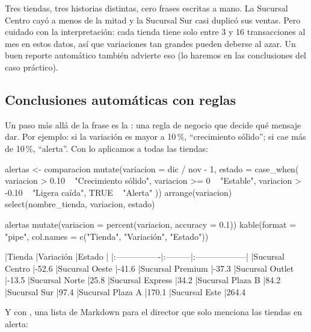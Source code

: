 Tres tiendas, tres historias distintas, cero frases escritas a mano. La
Sucursal Centro cayó a menos de la mitad y la Sucursal Sur casi duplicó sus
ventas. Pero cuidado con la interpretación: cada tienda tiene solo entre 3 y
16 transacciones al mes en estos datos, así que variaciones tan grandes
pueden deberse al azar. Un buen reporte automático también advierte eso
(lo haremos en las conclusiones del caso práctico).

\subsection{Conclusiones automáticas con reglas}

Un paso más allá de la frase es la : una
regla de negocio que decide qué mensaje dar. Por ejemplo: si la variación es
mayor a 10\,\%, ``crecimiento sólido''; si cae más de 10\,\%, ``alerta''. Con
 lo aplicamos a todas las tiendas:

\begin{rcode}
alertas <- comparacion %
  mutate(variacion = dic / nov - 1,
         estado = case_when(
           variacion >  0.10 ~ "Crecimiento sólido",
           variacion >= 0    ~ "Estable",
           variacion > -0.10 ~ "Ligera caída",
           TRUE              ~ "Alerta"
         )) %
  arrange(variacion) %
  select(nombre_tienda, variacion, estado)

alertas %
  mutate(variacion = percent(variacion, accuracy = 0.1)) %
  kable(format = "pipe", col.names = c("Tienda", "Variación", "Estado"))
\end{rcode}
\begin{rsalida}


|Tienda           |Variación |Estado             |
|:----------------|:---------|:------------------|
|Sucursal Centro  |-52.6%
|Sucursal Oeste   |-41.6%
|Sucursal Premium |-37.3%
|Sucursal Outlet  |-13.5%
|Sucursal Norte   |25.8%
|Sucursal Express |34.2%
|Sucursal Plaza B |84.2%
|Sucursal Sur     |97.4%
|Sucursal Plaza A |170.1%
|Sucursal Este    |264.4%
\end{rsalida}

Y con , una lista de Markdown para el director que
solo menciona las tiendas en alerta:

